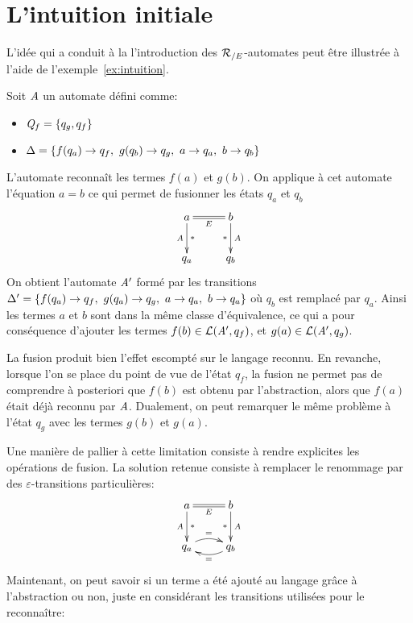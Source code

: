 



\section{L'intuition initiale}
\label{sec:intuition}
L'idée qui a conduit à la l'introduction des ${\mathcal R_{/E}}$-automates peut être illustrée à l'aide de l'exemple~\ref{ex:intuition}.
\begin{example}
  \label{ex:intuition}
  Soit $\mathit A$ un automate défini comme:
  \begin{itemize}
  \item $\mathit Q_f = \{ q_g, q_f\}$
  \item $\Delta = \{ f(q_a) \rightarrow q_f,\ g(q_b) \rightarrow q_g,\ a\rightarrow q_a,\ b\rightarrow q_b\}$
  \end{itemize}
  L'automate reconnaît les termes $f(a)$ et $g(b)$.
  On applique à cet automate l'équation $a = b$ ce qui permet de fusionner les états $q_a$ et $q_b$
  \[\xymatrix{
    a \ar@{=}_{E}[r]\ar[d]_{\A}^{*} & b \ar[d]_{*}^{\A}\\
    q_a & q_b
  }
  \]
  On obtient l'automate $\mathit A'$ formé par les transitions $\Delta' = \{ f(q_a) \rightarrow q_f,\ g(q_a) \rightarrow q_g,\ a\rightarrow q_a,\ b\rightarrow q_a\}$
  où $q_b$ est remplacé par $q_a$. Ainsi les termes $a$ et $b$ sont dans la même classe d'équivalence, ce qui a pour 
  conséquence d'ajouter les termes $f(b) \in \mathcal{L}(\mathit A', q_f)$, et $g(a) \in \mathcal{L}(\mathit A', q_g)$.
\end{example}

  La fusion produit bien l'effet escompté sur le langage reconnu. En revanche, lorsque l'on se place du point de vue
  de l'état $q_f$, la fusion ne permet pas de comprendre à posteriori que  $f(b)$ est obtenu par l'abstraction, 
  alors que $f(a)$ était déjà reconnu par $\mathit A$. Dualement, on peut remarquer le même problème à l'état $q_g$ avec les termes
  $g(b)$ et $g(a)$.

  Une manière de pallier à cette limitation consiste à rendre explicites les opérations de fusion.
  La solution retenue consiste à remplacer le renommage par des $\varepsilon$-transitions particulières:
  \[\xymatrix{
    a \ar@{=}_{E}[r]\ar[d]_{\A}^{*} & b \ar[d]_{*}^{\A}\\
    q_a \ar@/^0.6pc/[r]^{=} & q_b \ar@/^0.6pc/[l]^{=}
  }
  \]
  Maintenant, on peut savoir si un terme a été ajouté au langage grâce à l'abstraction ou non, juste en considérant
  les transitions utilisées pour le reconnaître:

